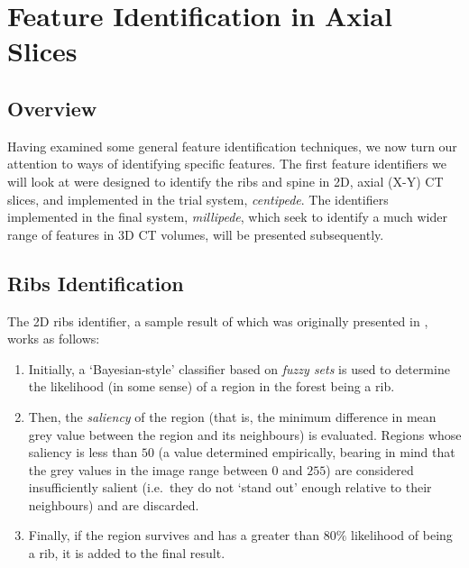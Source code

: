 
\afterpage{\clearpage}
\newpage

\section{Feature Identification in Axial Slices}
\label{sec:featureid-2d}

\subsection{Overview}

Having examined some general feature identification techniques, we now turn our attention to ways of identifying specific features. The first feature identifiers we will look at were designed to identify the ribs and spine in 2D, axial (X-Y) CT slices, and implemented in the trial system, \emph{centipede}. The identifiers implemented in the final system, \emph{millipede}, which seek to identify a much wider range of features in 3D CT volumes, will be presented subsequently.

\subsection{Ribs Identification}
\label{subsec:featureid-2d-ribs}


The 2D ribs identifier, a sample result of which was originally presented in \cite{gvccimi08}, works as follows:

\begin{enumerate}

\item Initially, a `Bayesian-style' classifier based on \emph{fuzzy sets} is used to determine the likelihood (in some sense) of a region in the forest being a rib.
\item Then, the \emph{saliency} of the region (that is, the minimum difference in mean grey value between the region and its neighbours) is evaluated. Regions whose saliency is less than $50$ (a value determined empirically, bearing in mind that the grey values in the image range between $0$ and $255$) are considered insufficiently salient (i.e.~they do not `stand out' enough relative to their neighbours) and are discarded.
\item Finally, if the region survives and has a greater than $80\%$ likelihood of being a rib, it is added to the final result.

\end{enumerate}

